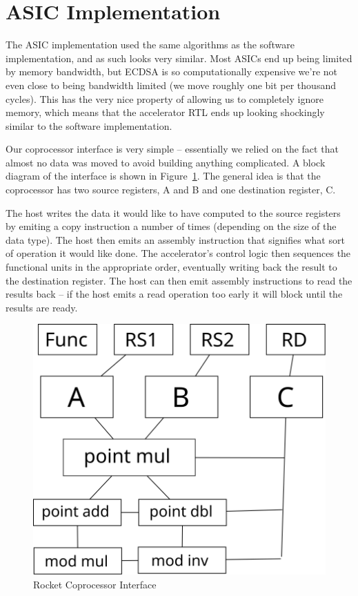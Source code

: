 \documentclass[twocolumn]{article}
\begin{document}
\section{ASIC Implementation}

The ASIC implementation used the same algorithms as the software
implementation, and as such looks very similar.  Most ASICs end up
being limited by memory bandwidth, but ECDSA is so computationally
expensive we're not even close to being bandwidth limited (we move
roughly one bit per thousand cycles).  This has the very nice property
of allowing us to completely ignore memory, which means that the
accelerator RTL ends up looking shockingly similar to the software
implementation.

Our coprocessor interface is very simple -- essentially we relied on
the fact that almost no data was moved to avoid building anything
complicated.  A block diagram of the interface is shown in
Figure~\ref{coproc}.  The general idea is that the coprocessor has two
source registers, A and B and one destination register, C.

The host writes the data it would like to have computed to the source
registers by emiting a copy instruction a number of times (depending
on the size of the data type).  The host then emits an assembly
instruction that signifies what sort of operation it would like done.
The accelerator's control logic then sequences the functional units in
the appropriate order, eventually writing back the result to the
destination register.  The host can then emit assembly instructions to
read the results back -- if the host emits a read operation too early
it will block until the results are ready.

\begin{figure}[t]
  \begin{center}
    \includegraphics[width=0.5\linewidth]{coproc.svg}
  \end{center}

  \caption{Rocket Coprocessor Interface
    \label{coproc}}
\end{figure}
\end{document}
